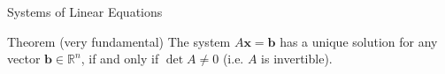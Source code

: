 \documentclass{beamer}
\newcommand{\vb}{\mathbf{b}}
\newcommand{\vx}{\mathbf{x}}
\newcommand{\R}{\mathbb{R}}
\begin{document}
\begin{frame}{Systems of Linear Equations}



    

\pause 

\begin{block}{Theorem (very fundamental)}
 The system $A\vx = \vb$ has a unique solution for any vector $\vb \in \mathbb{R}^n$, if and only if $\det A \ne 0$ (i.e. $A$ is invertible).
\end{block}
\end{frame}



       
       
       
\end{document}
